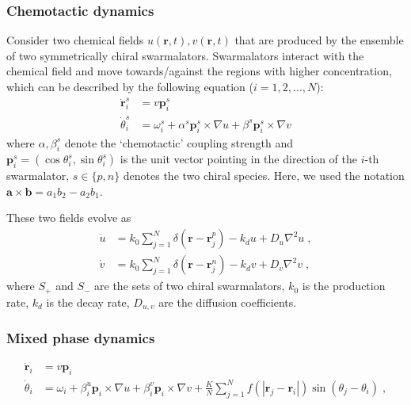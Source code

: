\documentclass{article}
\begin{document}
\subsubsection{Chemotactic dynamics}

Consider two chemical fields $u\left( \mathbf{r},t \right), v\left( \mathbf{r},t \right)$ that are produced by the ensemble of two symmetrically chiral swarmalators. Swarmalators interact with the chemical field and move towards/against the regions with higher concentration, which can be described by the following equation ($i=1, 2, \dots, N$):
\begin{subequations}
    \begin{align}
        \dot{\mathbf{r}}_{i}^{s}&=v\mathbf{p}_{i}^{s}\\
        \dot{\theta}_{i}^{s}&=\omega _{i}^{s}+\alpha ^{s}\mathbf{p}_{i}^{s}\times \nabla u+\beta ^{s}\mathbf{p}_{i}^{s}\times \nabla v
    \end{align}
\end{subequations}
where $\alpha, \beta _{i}^{s}$ denote the ‘chemotactic’ coupling strength and $\mathbf{p}_i^{s}=(\cos \theta^{s} _i,\sin \theta _i^{s})$ is the unit vector pointing in the direction of the $i$-th swarmalator, $s\in\{p, n\}$ denotes the two chiral species. Here, we used the notation $\mathbf{a}\times\mathbf{b}=a_1 b_2-a_2 b_1$.

These two fields evolve as
\begin{subequations}
    \begin{align}
    \dot{u}&=k_0\sum_{j=1}^N{\delta \left( \mathbf{r}-\mathbf{r}_{j}^{p} \right)}-k_du+D_u\nabla ^2u\;,\\
    \dot{v}&=k_0\sum_{j=1}^N{\delta \left( \mathbf{r}-\mathbf{r}_{j}^{n} \right)}-k_dv+D_v\nabla ^2v\;,
    \end{align}
\end{subequations}
where $S_+$ and $S_-$ are the sets of two chiral swarmalators, $k_0$ is the production rate, $k_d$ is the decay rate, $D_{u,v}$ are the diffusion coefficients.

\subsubsection{Mixed phase dynamics}
\begin{subequations}
    \begin{align}
        \dot{\mathbf{r}}_i&=v\mathbf{p}_i\\
        \dot{\theta}_i&=\omega _i+\beta _{i}^{u}\mathbf{p}_i\times \nabla u+\beta _{i}^{v}\mathbf{p}_i\times \nabla v+\frac{K}{N}\sum_{j=1}^N{f}\left( \left| \mathbf{r}_j-\mathbf{r}_i \right| \right) \sin \left( \theta _j-\theta _i \right) \;,
    \end{align}
\end{subequations}
\end{document}
